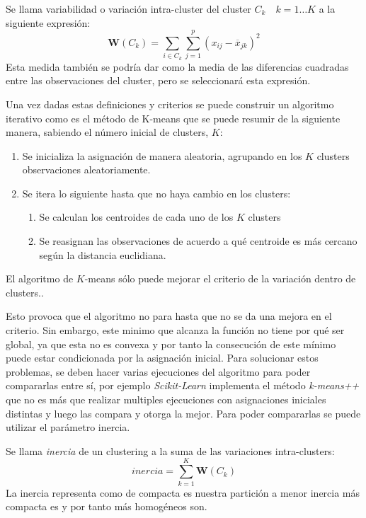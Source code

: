 \begin{defi}
Se llama variabilidad o variación intra-cluster del cluster $C_k\quad k=1\ldots K$ a la siguiente expresión:
\begin{equation}
\mathbf{W}(C_k)=\sum_{i\in C_k}\sum_{j=1}^{p} (x_{ij}-\overline{x}_{jk})^2
\end{equation}
\noindent Esta medida también se podría dar como la media de las diferencias cuadradas entre las observaciones del cluster, pero se seleccionará esta expresión. 
\end{defi}

\noindent Una vez dadas estas definiciones y criterios se puede construir un algoritmo iterativo como es el método de K-means que se puede resumir de la siguiente manera, sabiendo el número inicial de clusters, $K$:
\begin{enumerate}
\item Se inicializa la asignación de manera aleatoria, agrupando en los $K$ clusters observaciones aleatoriamente. 
\item Se itera lo siguiente hasta que no haya cambio en los clusters:
\begin{enumerate}
\item Se calculan los centroides de cada uno de los $K$ clusters
\item Se reasignan las observaciones de acuerdo a qué centroide es más cercano según la distancia euclidiana. 
\end{enumerate}
\end{enumerate}

\begin{propo}
El algoritmo de $K$-means sólo puede mejorar el criterio de la variación dentro de clusters.\cite{Scitovski 2021}. 
\end{propo}

\noindent Esto provoca que el algoritmo no para hasta que no se da una mejora en el criterio. Sin embargo, este minimo que alcanza la función no tiene por qué ser global, ya que esta no es convexa y por tanto la consecución de este mínimo puede estar condicionada por la asignación inicial. Para solucionar estos problemas, se deben hacer varias ejecuciones del algoritmo para poder compararlas entre sí, por ejemplo \emph{Scikit-Learn} implementa el método \emph{k-means++} que no es más que realizar multiples ejecuciones con asignaciones iniciales distintas y luego las compara y otorga la mejor. 
Para poder compararlas se puede utilizar el parámetro inercia\cite{Peña 2002}. 

\begin{defi}
Se llama \emph{inercia} de un clustering a la suma de las variaciones intra-clusters:
\begin{equation}
inercia=\sum_{k=1}^K \textbf{W}(C_k)
\end{equation}
La inercia representa como de compacta es nuestra partición a menor inercia más compacta es y por tanto más homogéneos son. 
\end{defi}

